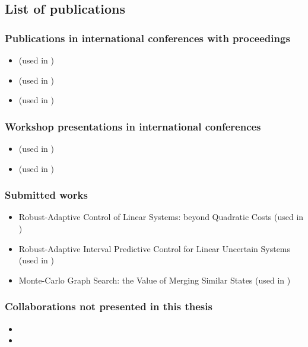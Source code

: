 \subsection*{List of publications}

\subsubsection*{Publications in international conferences with proceedings}

\begin{itemize}
	\item {} (used in )
	\item {} (used in )
	\item {} (used in )
\end{itemize}

\subsubsection*{Workshop presentations in international conferences}

\begin{itemize}
	\item {} (used in )
	\item {} (used in )
\end{itemize}

\subsubsection*{Submitted works}

\begin{itemize}
	\item Robust-Adaptive Control of Linear Systems: beyond Quadratic Costs (used in )
	\item Robust-Adaptive Interval Predictive Control for Linear Uncertain Systems (used in )
	\item Monte-Carlo Graph Search: the Value of Merging Similar States (used in )
\end{itemize}

\subsubsection*{Collaborations not presented in this thesis}

\begin{itemize}
	\item {}
	\item {}
\end{itemize}